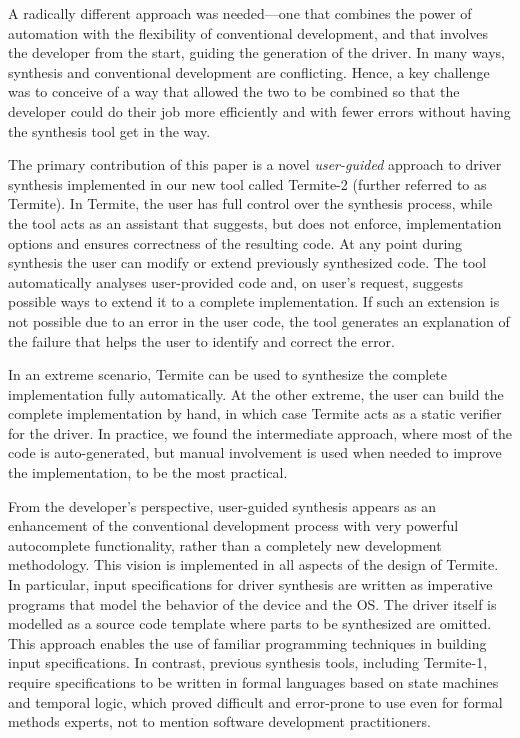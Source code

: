 \documentclass[a4paper,twoside,openright,11pt]{book}
\newcommand{\termite}{Termite\xspace}
\theoremstyle{definition}
\begin{document}
A radically different approach was needed---one that combines the power of automation with the flexibility of conventional development, and that involves the developer from the start, guiding the generation of the driver.  In many ways, synthesis and conventional development are conflicting.  Hence, a key challenge was to conceive of a way that allowed the two to be combined so that the developer could do their job more efficiently and with fewer errors without having the synthesis tool get in the way.

The primary contribution of this paper is a novel \emph{user-guided} approach to driver synthesis implemented in our new tool called \termite-2 (further referred to as \termite).  In \termite, the user has full control over the synthesis process, while the tool acts as an assistant that suggests, but does not enforce, implementation options and ensures correctness of the resulting code.  At any point during synthesis the user can modify or extend previously synthesized code.  The tool automatically analyses user-provided code and, on user's request, suggests possible ways to extend it to a complete implementation.  If such an extension is not possible due to an error in the user code, the tool generates an explanation of the failure that helps the user to identify and correct the error.

In an extreme scenario, \termite can be used to synthesize the complete implementation fully automatically.  At the other extreme, the user can build the complete implementation by hand, in which case \termite acts as a static verifier for the driver.  In practice, we found the intermediate approach, where most of the code is auto-generated, but manual involvement is used when needed to improve the implementation, to be the most practical.

From the developer's perspective, user-guided synthesis appears as an enhancement of the conventional development process with very powerful autocomplete functionality, rather than a completely new development methodology.  This vision is implemented in all aspects of the design of \termite.  In particular, input specifications for driver synthesis are written as imperative programs that model the behavior of the device and the OS.  The driver itself is modelled as a source code template where parts to be synthesized are omitted.  This approach enables the use of familiar programming techniques in building input specifications.  In contrast, previous synthesis tools, including Termite-1, require specifications to be written in formal languages based on state machines and temporal logic, which proved difficult and error-prone to use even for formal methods experts, not to mention software development practitioners.
\end{document}
